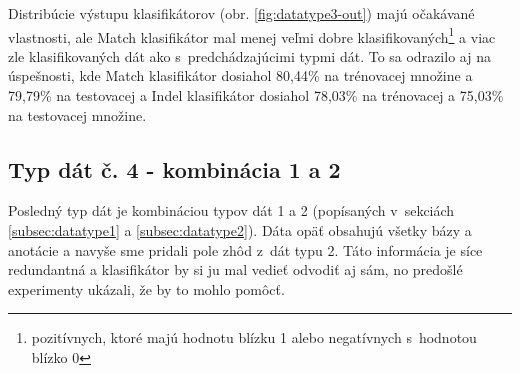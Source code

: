Distribúcie výstupu klasifikátorov (obr. \ref{fig:datatype3-out}) majú očakávané vlastnosti, ale Match klasifikátor mal menej veľmi dobre klasifikovaných\footnote{pozitívnych, ktoré majú hodnotu blízku 1 alebo negatívnych s~hodnotou blízko 0} a viac zle klasifikovaných dát ako s~predchádzajúcimi typmi dát.
To sa odrazilo aj na úspešnosti, kde Match klasifikátor dosiahol 80,44\% na trénovacej množine a 79,79\% na testovacej a Indel klasifikátor dosiahol 78,03\% na trénovacej a 75,03\% na testovacej množine.

\subsection{Typ dát č. 4 - kombinácia 1 a 2}

Posledný typ dát je kombináciou typov dát 1 a 2 (popísaných v~sekciách \ref{subsec:datatype1} a \ref{subsec:datatype2}). Dáta opäť obsahujú všetky bázy a anotácie a navyše sme pridali pole zhôd z~dát typu 2. Táto informácia je síce redundantná a klasifikátor by si ju mal vedieť odvodiť aj sám, no predošlé experimenty ukázali, že by to mohlo pomôcť.

